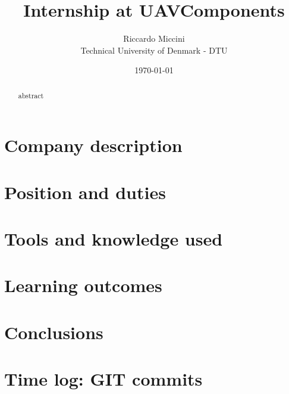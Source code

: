\documentclass[12pt, a4paper, oneside, twocolumn, final]{article}
\title{Internship at UAVComponents}
\author{Riccardo Miccini  \\
	Technical University of Denmark - DTU \\
	}
\date{\today}
\begin{document}
\maketitle

\begin{abstract}
abstract 
\end{abstract}

\tableofcontents

\section{Company description}


\section{Position and duties}


\section{Tools and knowledge used}


\section{Learning outcomes}


\section{Conclusions}


\appendix
\section{Time log: GIT commits}

\end{document}
